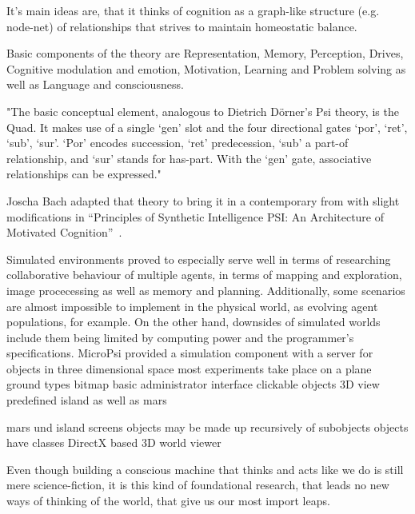 It's main ideas are, that it thinks of cognition as a graph-like structure (e.g. node-net) of relationships that strives to maintain homeostatic balance.\cite{Bach:2009:PSI:1611304}

Basic components of the theory are Representation, Memory, Perception, Drives, Cognitive modulation and emotion, Motivation, Learning and Problem solving as well as Language and consciousness. %

"The basic conceptual element, analogous to Dietrich Dörner’s Psi theory, is the Quad. It makes use of a single ‘gen’ slot and the four directional gates ‘por’, ‘ret’, ‘sub’, ‘sur’. ‘Por’ encodes succession, ‘ret’ predecession, ‘sub’ a part-of relationship, and ‘sur’ stands for has-part. With the ‘gen’ gate, associative relationships can be expressed."


Joscha Bach adapted that theory to bring it in a contemporary from with slight modifications in ``Principles of Synthetic Intelligence PSI: An Architecture of Motivated Cognition''~\cite{Bach:2009:PSI:1611304}.

Simulated environments proved to especially serve well in terms of researching collaborative behaviour of multiple agents, in terms of mapping and exploration, image procecessing as well as memory and planning. Additionally, some scenarios are almost impossible to implement in the physical world, as evolving agent populations, for example. On the other hand, downsides of simulated worlds include them being limited by computing power and the programmer's specifications.
MicroPsi provided a simulation component with a server for objects in three dimensional space
most experiments take place on a plane
ground types bitmap
basic administrator interface
clickable objects
3D view
predefined island as well as mars

mars und island screens
objects may be made up recursively of subobjects
objects have classes
DirectX based 3D world viewer

\cite{Bach:2009:PSI:1611304}


Even though building a conscious machine that thinks and acts like we do is still mere science-fiction, it is this kind of foundational research, that leads no new ways of thinking of the world, that give us our most import leaps.

